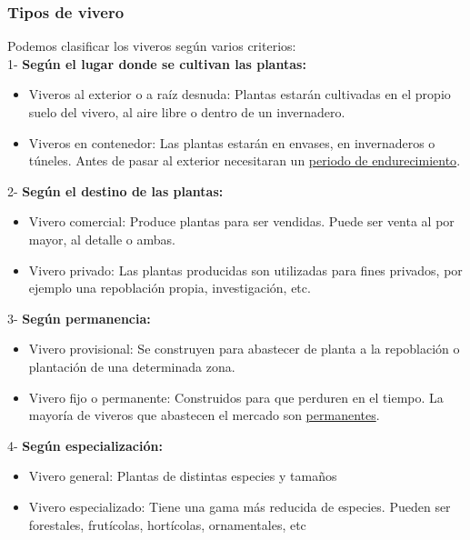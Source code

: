 \documentclass[a4paper,12pt,oneside]{article}
\begin{document}
\subsubsection{Tipos de vivero}
\label{sec:org6fcfe73}
Podemos clasificar los viveros según varios criterios:\\
1- \textbf{Según el lugar donde se cultivan las plantas:}
\begin{itemize}
\item Viveros al exterior o a raíz desnuda: Plantas estarán cultivadas en el propio
suelo del vivero, al aire libre o dentro de un invernadero.
\item Viveros en contenedor: Las plantas estarán en envases, en invernaderos o
túneles. Antes de pasar al exterior necesitaran un \uline{periodo de
endurecimiento}.
\end{itemize}
2- \textbf{Según el destino de las plantas:}
\begin{itemize}
\item Vivero comercial: Produce plantas para ser vendidas. Puede ser venta al por
mayor, al detalle o ambas.
\item Vivero privado: Las plantas producidas son utilizadas para fines privados, por
ejemplo una repoblación propia, investigación, etc.
\end{itemize}
3- \textbf{Según permanencia:}
\begin{itemize}
\item Vivero provisional: Se construyen para abastecer de planta a la repoblación o
plantación de una determinada zona.
\item Vivero fijo o permanente: Construidos para que perduren en el tiempo. La
mayoría de viveros que abastecen el mercado son \uline{permanentes}.
\end{itemize}
4- \textbf{Según especialización:}
\begin{itemize}
\item Vivero general: Plantas de distintas especies y tamaños
\item Vivero especializado: Tiene una gama más reducida de especies. Pueden ser
forestales, frutícolas, hortícolas, ornamentales, etc
\end{itemize}
\end{document}
